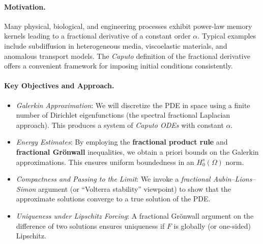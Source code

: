 \documentclass[12pt]{article}
\begin{document}
\paragraph{Motivation.}
Many physical, biological, and engineering processes exhibit power-law memory kernels leading to a fractional derivative of a constant order \(\alpha\). Typical examples include subdiffusion in heterogeneous media, viscoelastic materials, and anomalous transport models. The \emph{Caputo} definition of the fractional derivative offers a convenient framework for imposing initial conditions consistently.

\paragraph{Key Objectives and Approach.}
\begin{itemize}
    \item \emph{Galerkin Approximation}: We will discretize the PDE in space using a finite number of Dirichlet eigenfunctions (the spectral fractional Laplacian approach). This produces a system of \emph{Caputo ODEs} with constant \(\alpha\). 
    \item \emph{Energy Estimates}: By employing the \textbf{fractional product rule} and \textbf{fractional Gr\"onwall} inequalities, we obtain a priori bounds on the Galerkin approximations. This ensures uniform boundedness in an \(H_0^s(\Omega)\) norm.
    \item \emph{Compactness and Passing to the Limit}: We invoke a \emph{fractional Aubin--Lions--Simon} argument (or “Volterra stability” viewpoint) to show that the approximate solutions converge to a true solution of the PDE. 
    \item \emph{Uniqueness under Lipschitz Forcing}: A fractional Gr\"onwall argument on the difference of two solutions ensures uniqueness if \(F\) is globally (or one-sided) Lipschitz. 
\end{itemize}
\end{document}
